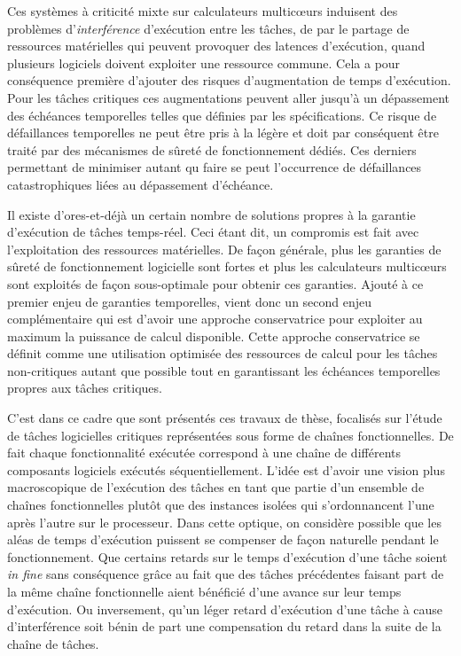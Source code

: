 \documentclass[french, a4paper, 11pt, twoside, pdftex]{StyleThese}
\begin{document}
Ces systèmes à criticité mixte sur calculateurs multicœurs induisent des problèmes d'\textit{interférence} d'exécution entre les tâches, de par le partage de ressources matérielles qui peuvent provoquer des latences d'exécution, quand plusieurs logiciels doivent exploiter une ressource commune. Cela a pour conséquence première d'ajouter des risques d'augmentation de temps d'exécution. Pour les tâches critiques ces augmentations peuvent aller jusqu'à un dépassement des échéances temporelles telles que définies par les spécifications. Ce risque de défaillances temporelles ne peut être pris à la légère et doit par conséquent être traité par des mécanismes de sûreté de fonctionnement dédiés. Ces derniers permettant de minimiser autant qu faire se peut l'occurrence de défaillances catastrophiques liées au dépassement d'échéance.

Il existe d'ores-et-déjà un certain nombre de solutions propres à la garantie d'exécution de tâches temps-réel. Ceci étant dit, un compromis est fait avec l'exploitation des ressources matérielles. De façon générale, plus les garanties de sûreté de fonctionnement logicielle sont fortes et plus les calculateurs multicœurs sont exploités de façon sous-optimale pour obtenir ces garanties. Ajouté à ce premier enjeu de garanties temporelles, vient donc un second enjeu complémentaire qui est d'avoir une approche conservatrice pour exploiter au maximum la puissance de calcul disponible. Cette approche conservatrice se définit comme une utilisation optimisée des ressources de calcul pour les tâches non-critiques autant que possible tout en garantissant les échéances temporelles propres aux tâches critiques.

C'est dans ce cadre que sont présentés ces travaux de thèse, focalisés sur l'étude de tâches logicielles critiques représentées sous forme de chaînes fonctionnelles. De fait chaque fonctionnalité exécutée correspond à une chaîne de différents composants logiciels exécutés séquentiellement. L'idée est d'avoir une vision plus macroscopique de l'exécution des tâches en tant que partie d'un ensemble de chaînes fonctionnelles plutôt que des instances isolées qui s'ordonnancent l'une après l'autre sur le processeur. Dans cette optique, on considère possible que les aléas de temps d'exécution puissent se compenser de façon naturelle pendant le fonctionnement. Que certains retards sur le temps d'exécution d'une tâche soient \textit{in fine} sans conséquence grâce au fait que des tâches précédentes faisant part de la même chaîne fonctionnelle aient bénéficié d'une avance sur leur temps d'exécution. Ou inversement, qu'un léger retard d'exécution d'une tâche à cause d'interférence soit bénin de part une compensation du retard dans la suite de la chaîne de tâches.
\end{document}
